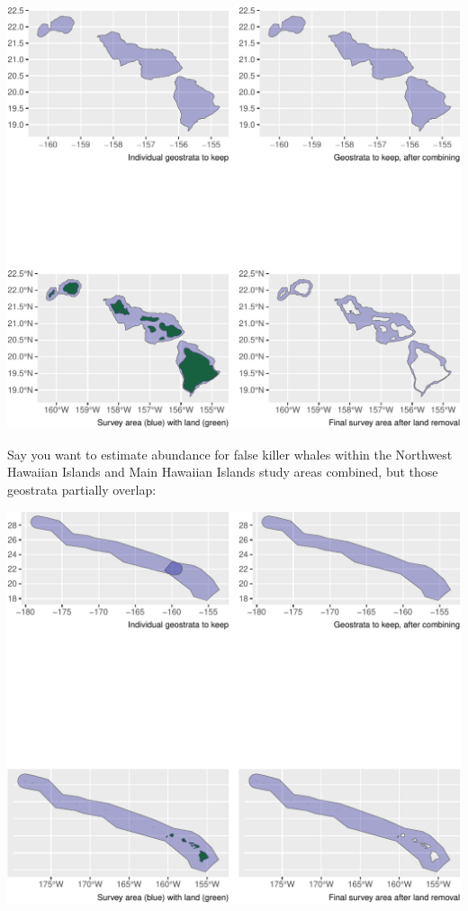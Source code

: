 \documentclass[
]{book}
\newenvironment{Shaded}{\begin{snugshade}}{\end{snugshade}}
\newcommand{\AttributeTok}[1]{\textcolor[rgb]{0.77,0.63,0.00}{#1}}
\newcommand{\ConstantTok}[1]{\textcolor[rgb]{0.00,0.00,0.00}{#1}}
\newcommand{\FunctionTok}[1]{\textcolor[rgb]{0.00,0.00,0.00}{#1}}
\newcommand{\NormalTok}[1]{#1}
\newcommand{\OtherTok}[1]{\textcolor[rgb]{0.56,0.35,0.01}{#1}}
\newcommand{\SpecialCharTok}[1]{\textcolor[rgb]{0.00,0.00,0.00}{#1}}
\newcommand{\StringTok}[1]{\textcolor[rgb]{0.31,0.60,0.02}{#1}}
\begin{document}
\includegraphics{figures/unnamed-chunk-253-1.pdf}

Say you want to estimate abundance for false killer whales within the Northwest Hawaiian Islands and Main Hawaiian Islands study areas combined, but those geostrata partially overlap:

\begin{Shaded}
\end{Shaded}

\includegraphics{figures/unnamed-chunk-254-1.pdf}
\end{document}
